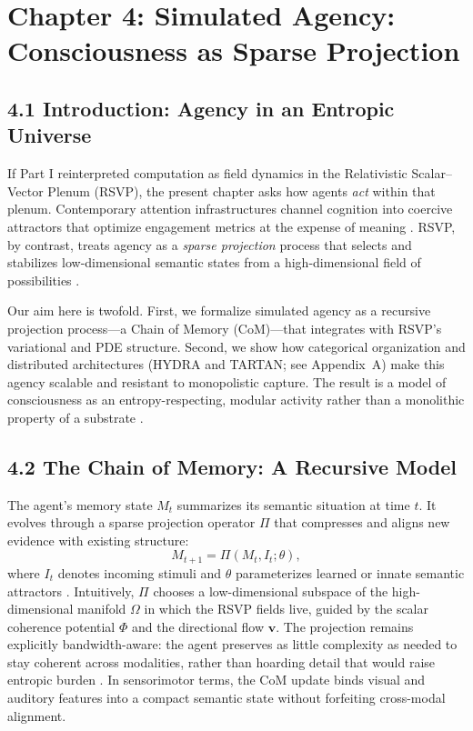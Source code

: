 \documentclass[12pt]{article}
\begin{document}
\section*{Chapter 4: Simulated Agency: Consciousness as Sparse Projection}

\subsection*{4.1 Introduction: Agency in an Entropic Universe}

If Part I reinterpreted computation as field dynamics in the Relativistic Scalar–Vector Plenum (RSVP), the present chapter asks how agents \emph{act} within that plenum. Contemporary attention infrastructures channel cognition into coercive attractors that optimize engagement metrics at the expense of meaning \citep{zuboff2019, lanier2018}. RSVP, by contrast, treats agency as a \emph{sparse projection} process that selects and stabilizes low-dimensional semantic states from a high-dimensional field of possibilities \citep{friston2010, tononi2004}. 

Our aim here is twofold. First, we formalize simulated agency as a recursive projection process---a Chain of Memory (CoM)---that integrates with RSVP’s variational and PDE structure. Second, we show how categorical organization and distributed architectures (HYDRA and TARTAN; see Appendix~A) make this agency scalable and resistant to monopolistic capture. The result is a model of consciousness as an entropy-respecting, modular activity rather than a monolithic property of a substrate \citep{hohwy2013}.

\subsection*{4.2 The Chain of Memory: A Recursive Model}

The agent’s memory state \(M_t\) summarizes its semantic situation at time \(t\). It evolves through a sparse projection operator \(\Pi\) that compresses and aligns new evidence with existing structure:
\[
M_{t+1} = \Pi(M_t, I_t; \theta),
\]
where \(I_t\) denotes incoming stimuli and \(\theta\) parameterizes learned or innate semantic attractors \citep{pearl2009}. Intuitively, \(\Pi\) chooses a low-dimensional subspace of the high-dimensional manifold \( \Omega \) in which the RSVP fields live, guided by the scalar coherence potential \(\Phi\) and the directional flow \(\mathbf{v}\). The projection remains explicitly bandwidth-aware: the agent preserves as little complexity as needed to stay coherent across modalities, rather than hoarding detail that would raise entropic burden \citep{friston2010}. In sensorimotor terms, the CoM update binds visual and auditory features into a compact semantic state without forfeiting cross-modal alignment.
\end{document}
